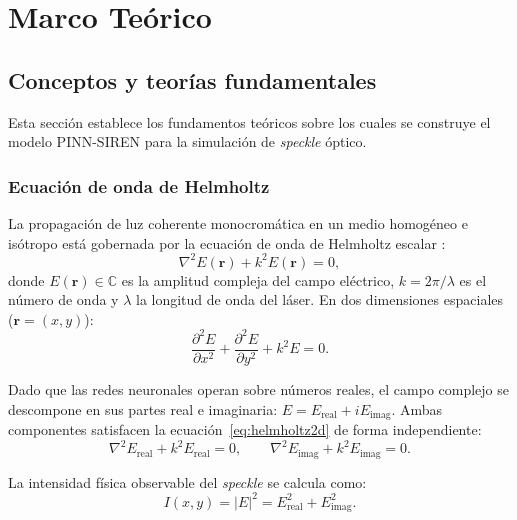 \chapter{Marco Teórico}\label{cap2:marcos}

\section{Conceptos y teorías fundamentales}

Esta sección establece los fundamentos teóricos sobre los cuales se construye
el modelo PINN-SIREN para la simulación de \textit{speckle} óptico.

\subsection{Ecuación de onda de Helmholtz}

La propagación de luz coherente monocromática en un medio homogéneo e isótropo
está gobernada por la ecuación de onda de Helmholtz escalar
\parencite{born1999principles, jin2014finite, goodman2007speckle}:
%
\begin{equation}
    \nabla^2 E(\mathbf{r}) + k^2 E(\mathbf{r}) = 0,
    \label{eq:helmholtz}
\end{equation}
%
donde $E(\mathbf{r}) \in \mathbb{C}$ es la amplitud compleja del campo eléctrico,
$k = 2\pi/\lambda$ es el número de onda y $\lambda$ la longitud de onda del
láser. En dos dimensiones espaciales ($\mathbf{r} = (x,y)$):
%
\begin{equation}
    \frac{\partial^2 E}{\partial x^2} + \frac{\partial^2 E}{\partial y^2}
    + k^2 E = 0.
    \label{eq:helmholtz2d}
\end{equation}

Dado que las redes neuronales operan sobre números reales, el campo complejo se
descompone en sus partes real e imaginaria: $E = E_\text{real} + iE_\text{imag}$.
Ambas componentes satisfacen la ecuación~\eqref{eq:helmholtz2d} de forma
independiente:
%
\begin{equation}
    \nabla^2 E_\text{real} + k^2 E_\text{real} = 0, \qquad
    \nabla^2 E_\text{imag} + k^2 E_\text{imag} = 0.
    \label{eq:helmholtz_split}
\end{equation}

La intensidad física observable del \textit{speckle} se calcula como:
%
\begin{equation}
    I(x,y) = |E|^2 = E_\text{real}^2 + E_\text{imag}^2.
    \label{eq:intensidad}
\end{equation}

